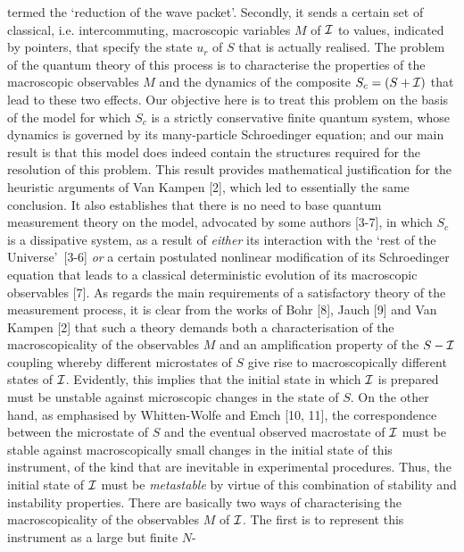 termed the \lq reduction of the wave packet\rq. Secondly, it sends a certain set of 
classical, i.e. intercommuting, macroscopic variables $M$ of  ${\cal I}$ to values, 
indicated by pointers,  that specify the state $u_{r}$ of $S$ that is actually realised. The 
problem of the quantum theory of this process is to characterise the properties of the 
macroscopic observables $M$ and the dynamics of the composite $S_{c}=(S+{\cal I})$ 
that lead to these two effects. Our objective here is to treat this problem on the basis of 
the model for which $S_{c}$ is a strictly conservative finite quantum system, whose 
dynamics is governed by its many-particle Schroedinger equation; and our main result is 
that this model does indeed contain the structures required for the resolution of this 
problem. This result provides mathematical justification for the heuristic arguments of 
Van Kampen [2], which led to essentially the same conclusion. It also establishes that 
there is no need to base quantum measurement theory on the model, advocated by some 
authors [3-7], in which $S_{c}$ is a dissipative system, as a result of {\it either} its 
interaction with the \lq rest of the Universe\rq\  [3-6] {\it or} a certain postulated 
nonlinear modification of its Schroedinger equation that leads to a classical deterministic 
evolution of its macroscopic observables [7].
\vskip 0.2cm
As regards the main requirements of a satisfactory theory of the measurement process, it 
is clear from the works of Bohr [8], Jauch [9] and Van Kampen [2] that such a theory 
demands both a characterisation of the macroscopicality of the observables $M$ and an 
amplification property of the $S-{\cal I}$ coupling whereby different microstates of $S$ 
give rise to macroscopically different states of ${\cal I}$. Evidently, this implies that the 
initial state in which ${\cal I}$ is prepared must be unstable against microscopic changes 
in the state of $S$. On the other hand, as emphasised by Whitten-Wolfe and Emch [10, 
11],  the correspondence between the microstate of $S$ and the eventual observed 
macrostate of ${\cal I}$ must be stable against macroscopically small changes in the 
initial state of this instrument, of the kind that are inevitable in experimental procedures. 
Thus, the initial state of ${\cal I}$ must be {\it metastable} by virtue of this combination 
of stability and instability properties. 
\vskip 0.2cm   
There are basically two ways of  characterising the macroscopicality of the observables 
$M$ of ${\cal I}$. The first is to represent this instrument as a large but finite $N$-
